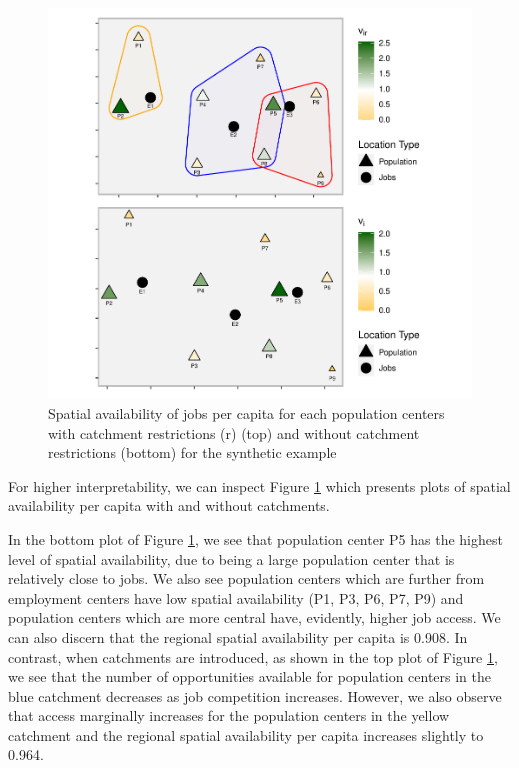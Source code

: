 \documentclass[]{elsarticle} %
\begin{document}
\begin{figure}
\includegraphics[width=1\linewidth]{Spatial-Availability_files/figure-latex/toy-example-availability-jobs-per-capita-1} \caption{\label{fig:toy-example-availability-jobs-per-capita} Spatial availability of jobs per capita for each population centers with catchment restrictions (r) (top) and without catchment restrictions (bottom) for the synthetic example}\label{fig:toy-example-availability-jobs-per-capita}
\end{figure}

For higher interpretability, we can inspect Figure
\ref{fig:toy-example-availability-jobs-per-capita} which presents plots
of spatial availability per capita with and without catchments.

In the bottom plot of Figure
\ref{fig:toy-example-availability-jobs-per-capita}, we see that
population center P5 has the highest level of spatial availability, due
to being a large population center that is relatively close to jobs. We
also see population centers which are further from employment centers
have low spatial availability (P1, P3, P6, P7, P9) and population
centers which are more central have, evidently, higher job access. We
can also discern that the regional spatial availability per capita is
0.908. In contrast, when catchments are introduced, as shown in the top
plot of Figure \ref{fig:toy-example-availability-jobs-per-capita}, we
see that the number of opportunities available for population centers in
the blue catchment decreases as job competition increases. However, we
also observe that access marginally increases for the population centers
in the yellow catchment and the regional spatial availability per capita
increases slightly to 0.964.
\end{document}
